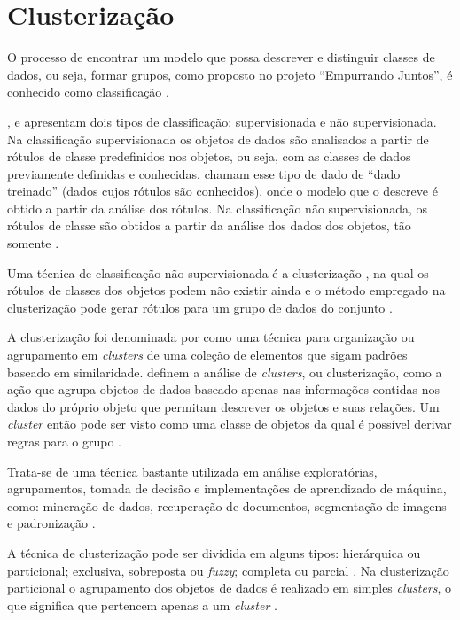 \chapter{Clusterização} \label{cap:clusterizacao}

O processo de encontrar um modelo que possa descrever e distinguir classes de dados, ou seja, formar 
grupos, como proposto no projeto ``Empurrando Juntos'', é conhecido como classificação \cite{han2011data}.

,  e  apresentam dois tipos de 
classificação: supervisionada e não supervisionada.
Na classificação supervisionada os objetos de dados são analisados a partir de rótulos de classe predefinidos nos objetos, ou seja, 
com as classes de dados previamente definidas e conhecidas.  chamam esse tipo de dado de ``dado treinado''
(dados cujos rótulos são conhecidos), onde o modelo que o descreve é obtido a partir da análise dos rótulos.
Na classificação não supervisionada, os rótulos de classe são obtidos a partir da análise dos dados dos objetos, tão somente \cite{tan2013data}.

Uma técnica de classificação não supervisionada é a clusterização \cite{clustering_review, tan2013data}, na qual os rótulos de classes dos objetos 
podem não existir ainda e o método empregado na clusterização pode gerar rótulos para um grupo de dados do conjunto \cite{han2011data}. 

A clusterização foi denominada por  como uma técnica para organização ou agrupamento em \textit{clusters} 
de uma coleção de elementos que sigam padrões baseado em similaridade.
 definem a análise de \textit{clusters}, ou clusterização, como a ação que agrupa objetos de dados
baseado apenas nas informações contidas nos dados do próprio objeto que permitam descrever os objetos e suas relações. Um \textit{cluster}
então pode ser visto como uma classe de objetos da qual é possível derivar regras para o grupo \cite{han2011data}.

Trata-se de uma técnica bastante utilizada em análise exploratórias, agrupamentos, 
tomada de decisão e implementações de aprendizado de máquina, como:
mineração de dados, recuperação de documentos, segmentação de imagens e padronização \cite{clustering_review}.

A técnica de clusterização pode ser dividida em alguns tipos: hierárquica ou particional; exclusiva, sobreposta ou \textit{fuzzy}; 
completa ou parcial \cite{tan2013data, clustering_review}. Na clusterização particional o agrupamento dos 
objetos de dados é realizado em simples \textit{clusters}, o que significa que pertencem apenas a um \textit{cluster} \cite{tan2013data}.

